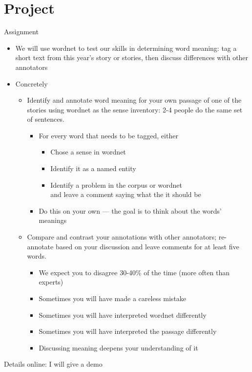 \section{Project}
\begin{frame}[allowframebreaks]{Assignment}

  \begin{itemize}
  \item We will use wordnet to test our skills in determining word meaning:
    tag a short text from this year's story or stories, then discuss
    differences with other annotators
\item Concretely
  \begin{itemize}
  \item[1] Identify and annotate word meaning for your own passage of
    one of the stories using wordnet as the sense inventory: 2-4 people do
    the same set of sentences.
  \begin{itemize}
  \item For every word that needs to be tagged, either
    \begin{itemize}
    \item Chose a sense in wordnet
    \item Identify it as a named entity
    \item Identify a problem in the corpus or wordnet
      \\ and leave a comment saying what the it should be
    \end{itemize}
  \item Do this on your own --- the goal is to think about the words' meanings
  \end{itemize}
  \framebreak
\item[2] Compare and contrast your annotations with other annotators;
  re-annotate based on your discussion and leave comments for at least
  five words.
  \begin{itemize}
  \item We expect you to disagree 30-40\% of the time (more often than experts)
  \item Sometimes you will have made a careless mistake
  \item Sometimes you will have interpreted wordnet differently
  \item Sometimes you will have interpreted the passage differently
  \item Discussing meaning deepens your understanding of it
  \end{itemize}
\end{itemize}
\end{itemize}
\begin{taskb}
  Details online: I will give a demo
\end{taskb}

\end{frame}
